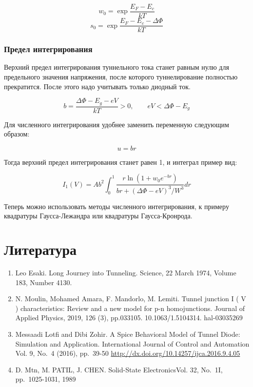 \documentclass[
]{article}
\providecommand{\tightlist}{%
  \setlength{\itemsep}{0pt}\setlength{\parskip}{0pt}}
\begin{document}
\[w_{0}=\exp\frac{E_{F}-E_{c}}{kT} \tag{9}\]
\[s_{0}=\exp\frac{E_{F}-E_{c}-\Delta\Phi}{kT} \tag{10}\]

\subsubsection{Предел
интегрирования}\label{ux43fux440ux435ux434ux435ux43b-ux438ux43dux442ux435ux433ux440ux438ux440ux43eux432ux430ux43dux438ux44f}

Верхний предел интегрирования туннельного тока станет равным нулю для
предельного значения напряжения, после которого туннелирование полностью
прекратится. После этого надо учитывать только диодный ток.

\[b=\frac{\Delta\Phi-E_{g}-eV}{kT}>0,\qquad eV<\Delta\Phi-E_{g} \tag{11}\]

Для численного интегрирования удобнее заменить переменную следующим
образом:

\[u = b r\]

Тогда верхний предел интегрирования станет равен 1, и интеграл пример
вид:

\[I_{1}\left(V\right)=A b^2 \int_{0}^{1}\frac{r\ln\left(1+w_{0}e^{-br}\right)}{br+\left(\Delta\Phi-eV\right)^{3}/W^{3}}dr \tag{12}\]

Теперь можно использовать методы численного интегрирования, к примеру
квадратуры Гаусса-Лежандра или квадратуры Гаусса-Кронрода.

\section{Литература}\label{ux43bux438ux442ux435ux440ux430ux442ux443ux440ux430}

\begin{enumerate}
\def\labelenumi{\arabic{enumi}.}
\tightlist
\item
  Leo Esaki. Long Journey into Tunneling. Science, 22 March 1974, Volume
  183, Number 4130.
\item
  N. Moulin, Mohamed Amara, F. Mandorlo, M. Lemiti. Tunnel junction I (
  V ) characteristics: Review and a new model for p-n homojunctions.
  Journal of Applied Physics, 2019, 126 (3), pp.033105.
  10.1063/1.5104314. hal-03035269
\item
  Messaadi Lotfi and Dibi Zohir. A Spice Behavioral Model of Tunnel
  Diode: Simulation and Application. International Journal of Control
  and Automation Vol. 9, No.~4 (2016), pp.~39-50
  \url{http://dx.doi.org/10.14257/ijca.2016.9.4.05}
\item
  D. Mtn, M. PATIL, J. CHEN. Solid-State ElectronicsVol. 32, No.~1I,
  pp.~1025-1031, 1989
\end{enumerate}
\end{document}
